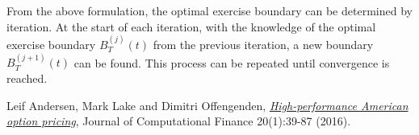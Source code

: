 \documentclass[12pt]{article}
\begin{document}
    From the above formulation, the optimal exercise boundary can be determined by iteration. At the start of
    each iteration, with the knowledge of the optimal exercise boundary $B_T^{(j)}(t)$ from the previous iteration,
    a new boundary $B_T^{(j+1)}(t)$ can be found. This process can be repeated until convergence is reached.





\begin{thebibliography}{99}
    Leif Andersen, Mark Lake and Dimitri Offengenden,
    \href{https://www.risk.net/journal-of-computational-finance/2464632/high-performance-american-option-pricing}
    {\it High-performance American option pricing},
    Journal of Computational Finance 20(1):39-87 (2016).
\end{thebibliography}
\end{document}
